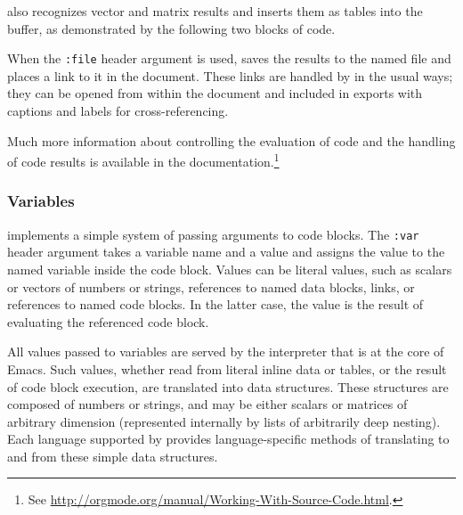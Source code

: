 \documentclass[article,shortnames]{jss}
\begin{document}
 also recognizes vector and matrix results and
inserts them as tables into the buffer, as demonstrated by the
following two blocks of  code.










When the \texttt{:file} header argument is used,  saves the results
to the named file and places a link to it in the document. These links
are handled by  in the usual ways; they can be opened from
within the document and included in exports with captions and labels
for cross-referencing.

Much more information about controlling the evaluation of code and the
handling of code results is available in the 
documentation.\footnote{See \href{http://orgmode.org/manual/Working-With-Source-Code.html}{http://orgmode.org/manual/Working-With-Source-Code.html}. }
\subsubsection{Variables}
\label{sec-3-2-4}

 implements a simple system of passing arguments to code
blocks.  The \texttt{:var} header argument takes a variable name and a value
and assigns the value to the named variable inside the code block.
Values can be literal values, such as scalars or vectors of numbers or
strings, references to named data blocks, links, or references to
named code blocks.  In the latter case, the value is the result of
evaluating the referenced code block.

All values passed to variables are served by the 
interpreter that is at the core of Emacs.  Such values, whether read
from literal inline data or tables, or the result of code block
execution, are translated into  data structures.  These
structures are composed of numbers or strings, and may be either
scalars or matrices of arbitrary dimension (represented internally by
 lists of arbitrarily deep nesting).  Each language supported by
 provides language-specific methods of translating to and from
these simple  data structures.
\end{document}

